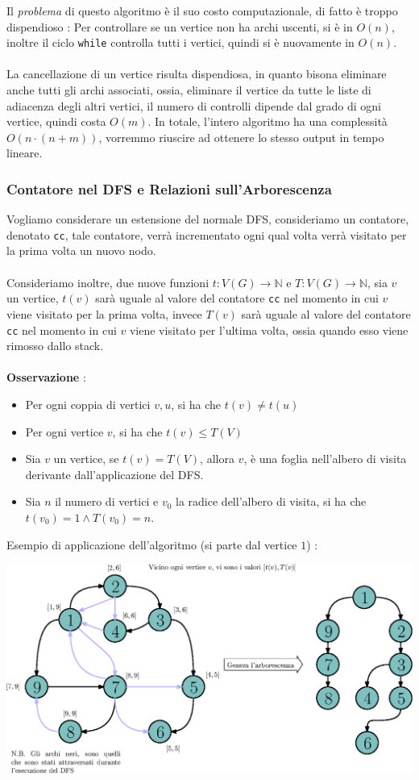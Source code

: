 \documentclass[12pt, letterpaper]{article}
\newcommand{\code}[1]{\colorbox{light-gray}{\texttt{#1}}}
\newcommand{\acc}{\\\hphantom{}\\}
\begin{document}
Il \textit{problema} di questo algoritmo è il suo costo computazionale, di fatto è troppo dispendioso : Per
controllare se un vertice non ha archi uscenti, si è in \(O(n)\), inoltre il ciclo \code{while} controlla
tutti i vertici, quindi si è nuovamente in \(O(n)\).    \acc  La cancellazione di un vertice risulta dispendiosa, in
quanto bisona eliminare anche tutti gli archi associati, ossia, eliminare il vertice da tutte le liste
di adiacenza degli altri vertici, il numero di controlli dipende dal grado di ogni vertice,
quindi costa \(O(m)\). In totale, l'intero algoritmo ha una complessità \(O(n\cdot(n+m))\), vorremmo riuscire
ad ottenere lo stesso output in tempo lineare.
\subsubsection{Contatore nel DFS e Relazioni sull'Arborescenza}
Vogliamo considerare un estensione del normale DFS, consideriamo un contatore, denotato \code{cc}, tale contatore,
verrà incrementato ogni qual volta verrà visitato per la prima volta un nuovo nodo.\acc Consideriamo inoltre, due nuove
funzioni \(t:V(G)\rightarrow\mathbb{N}\) e \(T:V(G)\rightarrow\mathbb{N}\), sia \(v\) un vertice, \(t(v)\) sarà uguale al valore
del contatore \code{cc} nel momento in cui \(v\) viene visitato per la prima volta, invece \(T(v)\) sarà uguale al valore
del contatore \code{cc} nel momento in cui \(v\) viene visitato per l'ultima volta, ossia quando esso viene rimosso dallo stack.\acc
\textbf{Osservazione} : \begin{itemize}
    \item Per ogni coppia di vertici \(v,u\), si ha che \(t(v)\ne t(u)\)
    \item Per ogni vertice \(v\), si ha che \(t(v)\le T(V)\)
    \item Sia \(v\) un vertice, se \(t(v)=T(V)\), allora \(v\), è una foglia nell'albero di visita derivante dall'applicazione
          del DFS.
    \item Sia \(n\) il numero di vertici e \(v_0\) la radice dell'albero di visita, si ha che \(t(v_0)=1\land T(v_0)=n\).
\end{itemize}
Esempio di applicazione dell'algoritmo (si parte dal vertice \(1\)) : \begin{center}
    \includegraphics[width=1.05\textwidth ]{images/dfsContatore.eps}
\end{center}
\end{document}
